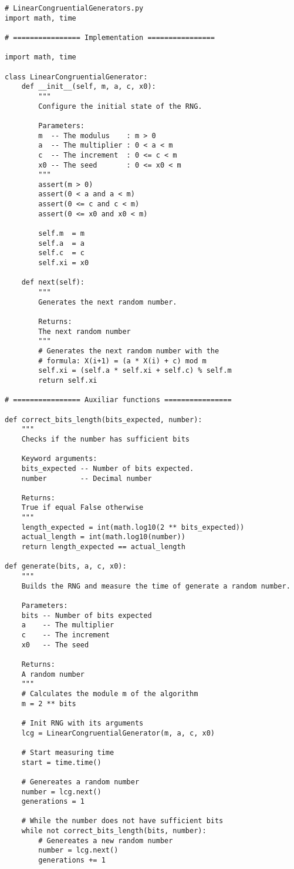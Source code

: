 \documentclass{article}
\begin{document}
\begin{lstlisting}
# LinearCongruentialGenerators.py
import math, time

# ================ Implementation ================

import math, time

class LinearCongruentialGenerator:
	def __init__(self, m, a, c, x0):
		"""
		Configure the initial state of the RNG.

		Parameters:
		m  -- The modulus    : m > 0
		a  -- The multiplier : 0 < a < m 
		c  -- The increment  : 0 <= c < m
		x0 -- The seed       : 0 <= x0 < m
		"""
		assert(m > 0)
		assert(0 < a and a < m)
		assert(0 <= c and c < m)
		assert(0 <= x0 and x0 < m)

		self.m  = m
		self.a  = a
		self.c  = c
		self.xi = x0

	def next(self):
		"""
		Generates the next random number.

		Returns:
		The next random number
		"""
		# Generates the next random number with the
		# formula: X(i+1) = (a * X(i) + c) mod m
		self.xi = (self.a * self.xi + self.c) % self.m
		return self.xi

# ================ Auxiliar functions ================

def correct_bits_length(bits_expected, number):
	"""
	Checks if the number has sufficient bits

	Keyword arguments:
	bits_expected -- Number of bits expected. 
	number        -- Decimal number

	Returns:
	True if equal False otherwise
	"""
	length_expected = int(math.log10(2 ** bits_expected))
	actual_length = int(math.log10(number))
	return length_expected == actual_length

def generate(bits, a, c, x0):
	"""
	Builds the RNG and measure the time of generate a random number.

	Parameters:
    bits -- Number of bits expected
	a    -- The multiplier
	c    -- The increment
	x0   -- The seed

    Returns:
    A random number
	"""
	# Calculates the module m of the algorithm
	m = 2 ** bits

	# Init RNG with its arguments
	lcg = LinearCongruentialGenerator(m, a, c, x0)

	# Start measuring time
	start = time.time()

	# Genereates a random number
	number = lcg.next()
	generations = 1

	# While the number does not have sufficient bits
	while not correct_bits_length(bits, number):
		# Genereates a new random number
		number = lcg.next()
		generations += 1


\end{lstlisting}
\end{document}
